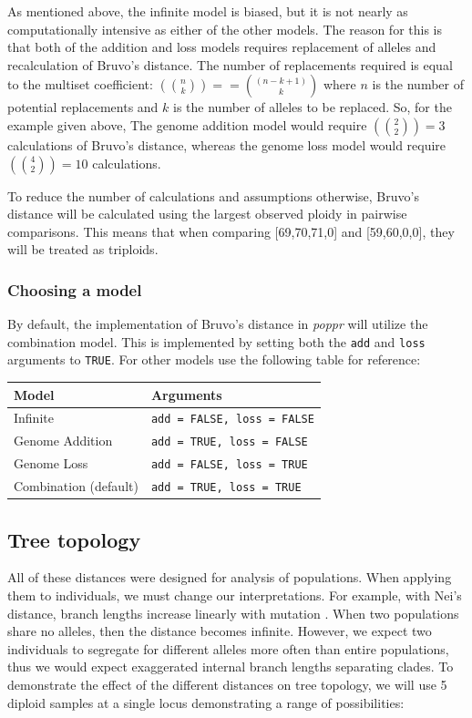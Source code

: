 \documentclass[letterpaper]{article}\usepackage[]{graphicx}\usepackage[]{color}
\newcommand{\poppr}{\textit{poppr}}
\begin{document}
As mentioned above, the infinite model is biased, but it is not nearly as
computationally intensive as either of the other models. The reason for this is
that both of the addition and loss models requires replacement of alleles and
recalculation of Bruvo's distance. The number of replacements required is equal
to the multiset coefficient: $\left({n \choose k}\right) == {(n-k+1) \choose k}$
where $n$ is the number of potential replacements and $k$ is the number of
alleles to be replaced. So, for the example given above, The genome addition
model would require $\left({2 \choose 2}\right) = 3$ calculations of Bruvo's
distance, whereas the genome loss model would require $\left({4 \choose
2}\right) = 10$ calculations.

To reduce the number of calculations and assumptions otherwise, Bruvo's distance
will be calculated using the largest observed ploidy in pairwise comparisons. 
This means that when
comparing [69,70,71,0] and [59,60,0,0], they will be treated as triploids.

\subsubsection{Choosing a model}
\label{appendix:algorithm:bruvomodel}
By default, the implementation of Bruvo's distance in \poppr{} will utilize the
combination model. This is implemented by setting both the \texttt{add} and 
\texttt{loss} arguments to \texttt{TRUE}. For other models use the following 
table for reference:

\begin{table}[ht]
\centering
\begin{tabular}{ll}
  \hline
Model & Arguments \\
  \hline
Infinite & \texttt{add = FALSE, loss = FALSE} \\
Genome Addition & \texttt{add = TRUE, loss = FALSE} \\
Genome Loss & \texttt{add = FALSE, loss = TRUE} \\
Combination (default) & \texttt{add = TRUE, loss = TRUE} \\
  \hline
\end{tabular}
\end{table}

\subsection{Tree topology}

All of these distances were designed for analysis of populations. When applying
them to individuals, we must change our interpretations. For example, with Nei's
distance, branch lengths increase linearly with mutation
\citep{nei1972genetic,nei1978estimation}. When two populations share no alleles,
then the distance becomes infinite. However, we expect two individuals to
segregate for different alleles more often than entire populations, thus we
would expect exaggerated internal branch lengths separating clades. To
demonstrate the effect of the different distances on tree topology, we will use
5 diploid samples at a single locus demonstrating a range of possibilities:
\end{document}
